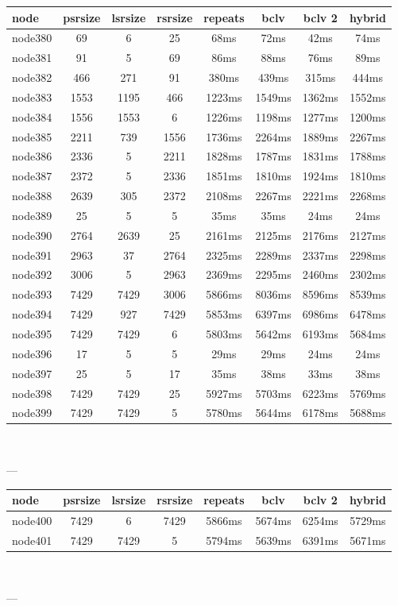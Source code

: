 \begin{tabular}{|l|c|c|c|c|c|c|c|}
\hline node & psrsize & lsrsize & rsrsize   & repeats & bclv & bclv 2 & hybrid\\
    \hline node380 & 69 & 6 & 25 & 68ms & 72ms & 42ms & 74ms\\
    \hline node381 & 91 & 5 & 69 & 86ms & 88ms & 76ms & 89ms\\
    \hline node382 & 466 & 271 & 91 & 380ms & 439ms & 315ms & 444ms\\
    \hline node383 & 1553 & 1195 & 466 & 1223ms & 1549ms & 1362ms & 1552ms\\
    \hline node384 & 1556 & 1553 & 6 & 1226ms & 1198ms & 1277ms & 1200ms\\
    \hline node385 & 2211 & 739 & 1556 & 1736ms & 2264ms & 1889ms & 2267ms\\
    \hline node386 & 2336 & 5 & 2211 & 1828ms & 1787ms & 1831ms & 1788ms\\
    \hline node387 & 2372 & 5 & 2336 & 1851ms & 1810ms & 1924ms & 1810ms\\
    \hline node388 & 2639 & 305 & 2372 & 2108ms & 2267ms & 2221ms & 2268ms\\
    \hline node389 & 25 & 5 & 5 & 35ms & 35ms & 24ms & 24ms\\
    \hline node390 & 2764 & 2639 & 25 & 2161ms & 2125ms & 2176ms & 2127ms\\
    \hline node391 & 2963 & 37 & 2764 & 2325ms & 2289ms & 2337ms & 2298ms\\
    \hline node392 & 3006 & 5 & 2963 & 2369ms & 2295ms & 2460ms & 2302ms\\
    \hline node393 & 7429 & 7429 & 3006 & 5866ms & 8036ms & 8596ms & 8539ms\\
    \hline node394 & 7429 & 927 & 7429 & 5853ms & 6397ms & 6986ms & 6478ms\\
    \hline node395 & 7429 & 7429 & 6 & 5803ms & 5642ms & 6193ms & 5684ms\\
    \hline node396 & 17 & 5 & 5 & 29ms & 29ms & 24ms & 24ms\\
    \hline node397 & 25 & 5 & 17 & 35ms & 38ms & 33ms & 38ms\\
    \hline node398 & 7429 & 7429 & 25 & 5927ms & 5703ms & 6223ms & 5769ms\\
    \hline node399 & 7429 & 7429 & 5 & 5780ms & 5644ms & 6178ms & 5688ms\\

\hline
\end{tabular} \

---


\begin{tabular}{|l|c|c|c|c|c|c|c|}
\hline node & psrsize & lsrsize & rsrsize   & repeats & bclv & bclv 2 & hybrid\\
    \hline node400 & 7429 & 6 & 7429 & 5866ms & 5674ms & 6254ms & 5729ms\\
    \hline node401 & 7429 & 7429 & 5 & 5794ms & 5639ms & 6391ms & 5671ms\\

\hline
\end{tabular} \

---

